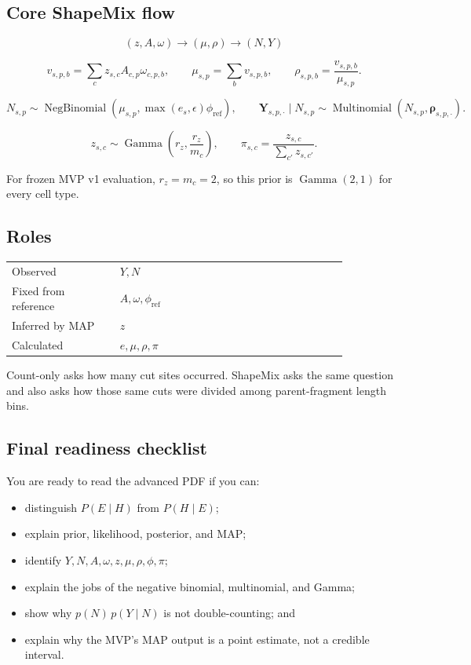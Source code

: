 \documentclass[11pt]{article}
\newcommand{\NB}{\operatorname{NegBinomial}}
\newcommand{\Mult}{\operatorname{Multinomial}}
\newcommand{\Gam}{\operatorname{Gamma}}
\begin{document}
\subsection*{Core ShapeMix flow}

\[
\boxed{
(z,A,\omega)
\longrightarrow
(\mu,\rho)
\longrightarrow
(N,Y)
}
\]

\[
v_{s,p,b}=\sum_cz_{s,c}A_{c,p}\omega_{c,p,b},
\qquad
\mu_{s,p}=\sum_bv_{s,p,b},
\qquad
\rho_{s,p,b}=\frac{v_{s,p,b}}{\mu_{s,p}}.
\]

\[
N_{s,p}\sim\NB\!\left(
\mu_{s,p},\max(e_s,\epsilon)\phi_{\mathrm{ref}}
\right),
\qquad
\boldsymbol{Y}_{s,p,\boldsymbol{\cdot}}\mid N_{s,p}
\sim\Mult(N_{s,p},\boldsymbol{\rho}_{s,p,\boldsymbol{\cdot}}).
\]

\[
z_{s,c}\sim\Gam\left(r_z,\frac{r_z}{m_c}\right),
\qquad
\pi_{s,c}=\frac{z_{s,c}}{\sum_{c'}z_{s,c'}}.
\]

For frozen MVP v1 evaluation, \(r_z=m_c=2\), so this prior is
\(\Gam(2,1)\) for every cell type.

\subsection*{Roles}

\begin{center}
\begin{tabular}{L{0.27\linewidth}L{0.58\linewidth}}
\toprule
Observed & \(Y,N\) \\
Fixed from reference & \(A,\omega,\phi_{\mathrm{ref}}\) \\
Inferred by MAP & \(z\) \\
Calculated & \(e,\mu,\rho,\pi\) \\
\bottomrule
\end{tabular}
\end{center}

\begin{bigidea}
Count-only asks how many cut sites occurred. ShapeMix asks the same question and
also asks how those same cuts were divided among parent-fragment length bins.
\end{bigidea}

\subsection*{Final readiness checklist}

You are ready to read the advanced PDF if you can:

\begin{itemize}[leftmargin=2em]
  \item distinguish \(P(E\mid H)\) from \(P(H\mid E)\);
  \item explain prior, likelihood, posterior, and MAP;
  \item identify \(Y,N,A,\omega,z,\mu,\rho,\phi,\pi\);
  \item explain the jobs of the negative binomial, multinomial, and Gamma;
  \item show why \(p(N)\,p(Y\mid N)\) is not double-counting; and
  \item explain why the MVP's MAP output is a point estimate, not a credible interval.
\end{itemize}
\end{document}

